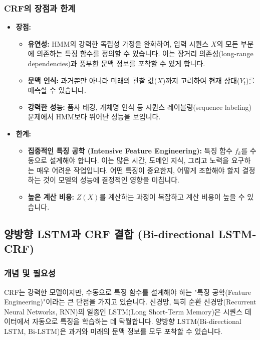\documentclass[11pt,a4paper]{article}
\begin{document}
\subsubsection{CRF의 장점과 한계}
\begin{itemize}
    \item \textbf{장점:}
    \begin{itemize}
        \item \textbf{유연성:} HMM의 강력한 독립성 가정을 완화하여, 입력 시퀀스 $X$의 모든 부분에 의존하는 특징 함수를 정의할 수 있습니다. 이는 장거리 의존성(long-range dependencies)과 풍부한 문맥 정보를 포착할 수 있게 합니다.
        \item \textbf{문맥 인식:} 과거뿐만 아니라 미래의 관찰 값($X$)까지 고려하여 현재 상태($Y_t$)를 예측할 수 있습니다.
        \item \textbf{강력한 성능:} 품사 태깅, 개체명 인식 등 시퀀스 레이블링(sequence labeling) 문제에서 HMM보다 뛰어난 성능을 보입니다.
    \end{itemize}
    \item \textbf{한계:}
    \begin{itemize}
        \item \textbf{집중적인 특징 공학 (Intensive Feature Engineering):} 특징 함수 $f_k$를 수동으로 설계해야 합니다. 이는 많은 시간, 도메인 지식, 그리고 노력을 요구하는 매우 어려운 작업입니다. 어떤 특징이 중요한지, 어떻게 조합해야 할지 결정하는 것이 모델의 성능에 결정적인 영향을 미칩니다.
        \item \textbf{높은 계산 비용:} $Z(X)$를 계산하는 과정이 복잡하고 계산 비용이 높을 수 있습니다.
    \end{itemize}
\end{itemize}

\subsection{양방향 LSTM과 CRF 결합 (Bi-directional LSTM-CRF)}

\subsubsection{개념 및 필요성}
CRF는 강력한 모델이지만, 수동으로 특징 함수를 설계해야 하는 "특징 공학(Feature Engineering)"이라는 큰 단점을 가지고 있습니다. 신경망, 특히 순환 신경망(Recurrent Neural Networks, RNN)의 일종인 LSTM(Long Short-Term Memory)은 시퀀스 데이터에서 자동으로 특징을 학습하는 데 탁월합니다. 양방향 LSTM(Bi-directional LSTM, Bi-LSTM)은 과거와 미래의 문맥 정보를 모두 포착할 수 있습니다.
\end{document}
